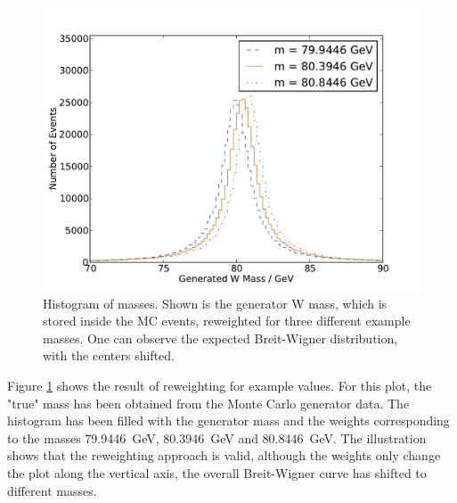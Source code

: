 \documentclass[
	paper=A4,
	parskip=full,
	chapterprefix=true,
	11pt,
	headings=normal,
	bibliography=totoc,
	listof=totoc,
	titlepage=on,
]{scrreprt}
\begin{document}
\begin{figure}
	\centering
	\includegraphics{mc_examples}
	\caption{Histogram of \PW masses. Shown is the generator W mass, which is stored inside the MC events, reweighted for three different example masses. One can observe the expected Breit-Wigner distribution, with the centers shifted.}
	\label{fig:mc_examples}
\end{figure}

Figure \ref{fig:mc_examples} shows the result of reweighting for example values. For this plot, the "true" \PW mass has been obtained from the Monte Carlo generator data. The histogram has been filled with the generator mass and the weights corresponding to the \PW masses \SI{79.9446}{\giga\electronvolt}, \SI{80.3946}{\giga\electronvolt} and \SI{80.8446}{\giga\electronvolt}. The illustration shows that the reweighting approach is valid, although the weights only change the plot along the vertical axis, the overall Breit-Wigner curve has shifted to different masses.
\end{document}
